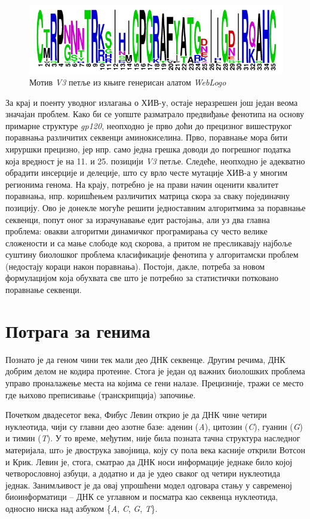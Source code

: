 \documentclass[12pt,oneside]{memoir}
\begin{document}
\begin{CJK}{UTF8}{ipxm}
\begin{figure}[H]
  \centering
  \includegraphics[width=.75\textwidth]{motif.png}
  \caption{Мотив \textit{V3} петље из књиге\cite{compeau2015} генерисан алатом \textit{WebLogo}\cite{weblogo}}
  \label{fig:motif}
\end{figure}

За крај и поенту уводног излагања о ХИВ-у, остаје неразрешен још један веома значајан проблем. Како би се уопште разматрало предвиђање фенотипа на основу примарне структуре \textit{gp120}, неопходно је прво доћи до прецизног вишеструког поравнања различитих секвенци аминокиселина. Прво, поравнање мора бити хируршки прецизно, јер нпр. само једна грешка доводи до погрешног податка која вредност је на 11. и 25. позицији \textit{V3} петље. Следеће, неопходно је адекватно обрадити инсерције и делеције, што су врло честе мутације ХИВ-а у многим регионима генома. На крају, потребно је на прави начин оценити квалитет поравнања, нпр. коришћењем различитих матрица скора за сваку појединачну позицију. Ово је донекле могуће решити једноставним алгоритмима за поравнање секвенци, попут оног за израчунавање едит растојања, али уз два главна проблема: овакви алгоритми динамичког програмирања су често велике сложености и са мање слободе код скорова, а притом не пресликавају најбоље суштину биолошког проблема класификације фенотипа у алгоритамски проблем (недостају кораци након поравнања). Постоји, дакле, потреба за новом формулацијом која обухвата све што је потребно за статистички потковано поравнање секвенци.

\section{Потрага за генима}
Познато је да геном чини тек мали део ДНК секвенце. Другим речима, ДНК добрим делом не кодира протеине. Стога је један од важних биолошких проблема управо проналажење места на којима се гени налазе. Прецизније, тражи се место где њихово преписивање (транскрипција) започиње.

Почетком двадесетог века, Фибус Левин открио је да ДНК чине четири нуклеотида\cite{levene1910}, чији су главни део азотне базе: аденин (\textit{A}), цитозин (\textit{C}), гуанин (\textit{G}) и тимин (\textit{T}). У то време, међутим, није била позната тачна структура наследног материјала, штo је двострука завојница, коју су пола века касније открили Вотсон и Крик\cite{watson1953}. Левин је, стога, сматрао да ДНК носи информације једнаке било којој четворословној азбуци, а додатно и да је удео сваког од четири нуклеотида једнак. Занимљивост је да овај упрошћени модел одговара стању у савременој биоинформатици -- ДНК се углавном и посматра као секвенца нуклеотида, односно ниска над азбуком \{\textit{A}, \textit{C}, \textit{G}, \textit{T}\}.


\end{CJK}
\end{document}
